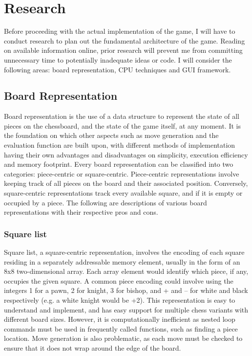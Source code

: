 \documentclass[../main/main.tex]{subfiles}
\begin{document}
\section{Research}
Before proceeding with the actual implementation of the game, I will have to conduct research to plan out the fundamental architecture of the game. Reading on available information online, prior research will prevent me from committing unnecessary time to potentially inadequate ideas or code. I will consider the following areas: board representation, CPU techniques and GUI framework.

\subsection{Board Representation}
Board representation is the use of a data structure to represent the state of all pieces on the chessboard, and the state of the game itself, at any moment. It is the foundation on which other aspects such as move generation and the evaluation function are built upon, with different methods of implementation having their own advantages and disadvantages on simplicity, execution efficiency and memory footprint. Every board representation can be classified into two categories: piece-centric or square-centric. Piece-centric representations involve keeping track of all pieces on the board and their associated position. Conversely, square-centric representations track every available square, and if it is empty or occupied by a piece. The following are descriptions of various board representations with their respective pros and cons.

\subsubsection*{Square list}
Square list, a square-centric representation, involves the encoding of each square residing in a separately addressable memory element, usually in the form of an 8x8 two-dimensional array. Each array element would identify which piece, if any, occupies the given square. A common piece encoding could involve using the integers 1 for a pawn, 2 for knight, 3 for bishop, and + and – for white and black respectively (e.g. a white knight would be +2). This representation is easy to understand and implement, and has easy support for multiple chess variants with different board sizes. However, it is computationally inefficient as nested loop commands must be used in frequently called functions, such as finding a piece location. Move generation is also problematic, as each move must be checked to ensure that it does not wrap around the edge of the board.
\end{document}
